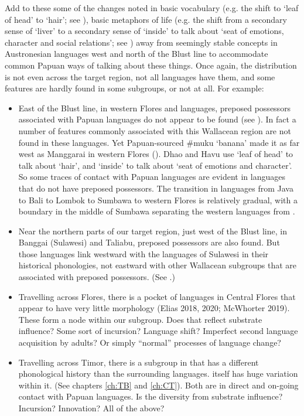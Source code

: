 Add to these some of the changes noted in basic vocabulary (e.g.
the shift to ‘leaf of head’ to ‘hair’; see ),
basic metaphors of life (e.g.
the shift from a secondary sense of ‘liver’ to a secondary sense
of ‘inside’ to talk about ‘seat of emotions,
character and social relations’; see ) away
from seemingly stable concepts in Austronesian languages west
and north of the Blust line to accommodate common Papuan ways
of talking about these things.
Once again, the distribution is not even across the target region,
not all languages have them,
and some features are hardly found in some subgroups,
or not at all.
For example: 

\begin{itemize}
\item	East of the Blust line,
in western Flores and  languages, preposed possessors
associated with Papuan languages do not appear to be found (see ).
In fact a number of features commonly associated with this Wallacean
region are not found in these languages.
Yet Papuan-sourced {\#}muku ‘banana’ made it as far west as Manggarai
in western Flores ().
Dhao and Havu use ‘leaf of head’ to talk about ‘hair’,
and ‘inside’ to talk about ‘seat of emotions and character’.
So some traces of contact with Papuan languages are evident in
languages that do not have preposed possessors.
The transition in languages from Java to Bali to Lombok to Sumbawa
to western Flores is relatively gradual,
with a boundary in the middle of Sumbawa separating the western languages from .

\item	Near the northern parts of our target region,
just west of the Blust line,
in Banggai (Sulawesi) and Taliabu, preposed possessors are also found.
But those languages link westward with the  languages
of Sulawesi in their historical phonologies,
not eastward with other Wallacean subgroups that are associated with preposed possessors.
(See .) 
\item	Travelling across Flores,
there is a pocket of languages in Central Flores that appear
to have very little morphology (Elias 2018, 2020; McWhorter 2019).
These form a node within our  subgroup.
Does that reflect substrate influence? Some sort of incursion?
Language shift? Imperfect second language acquisition by adults?
Or simply ``normal'' processes of language change?

\item	Travelling across Timor,
there is a subgroup in  that has a different
phonological history than the surrounding  languages.
 itself has huge variation within it.
(See chapters \ref{ch:TB} and \ref{ch:CT}).
Both are in direct
and on-going contact with Papuan languages.
Is the diversity from substrate influence? Incursion? Innovation?
All of the above?


\end{itemize}
